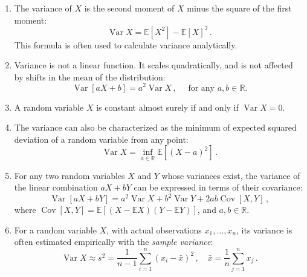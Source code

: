 \documentclass[12pt]{article}
\newcommand{\real}{\mathbb{R}}
\newcommand{\E}{\mathbb{E}}
\DeclareMathOperator{\Var}{Var}
\DeclareMathOperator{\Cov}{Cov}
\begin{document}
\begin{enumerate}
\item
The variance of $X$ is the second moment of $X$ minus 
the square of the first moment:
\[
\Var X  = \E[X^2] - \E[X]^2\,.
\]
This formula is often used to calculate variance analytically.

\item
Variance is not a linear function. It scales quadratically,
and is not affected by shifts in the mean of the distribution:
\[
\Var[ aX + b ] = a^2 \Var X\,, \quad \text{ for any $a, b \in \real$.}
\]

\item
A random variable $X$ is constant almost surely if and only
if $\Var X = 0$.

\item
The variance can also be characterized as
the minimum of expected squared deviation of a random variable from any point:
\[
\Var X = \inf_{a \in \real} \E[(X-a)^2]\,.
\]

\item
For any two random variables $X$ and $Y$ whose variances exist,
the variance of the linear combination $aX + bY$
can be expressed in terms of their covariance:
\[
\Var[aX+bY] = a^2 \Var X  + b^2 \Var Y  + 2ab \Cov[X,Y]\,,
\]
where $\Cov[X,Y] = \E[(X-\E X)(Y-\E Y)]$,
and $a, b \in \real$.

\item
For a random variable $X$, with actual observations $x_1, \dotsc, x_n$,
its variance is often estimated
empirically with the \emph{sample variance}:
\[
\Var X  \approx s^2 = \frac{1}{n-1} \sum_{i=1}^n (x_i - \bar{x})^2\,,
\quad
\bar{x} = \frac{1}{n} \sum_{j=1}^n x_j\,.
\]

\end{enumerate}

\end{document}
